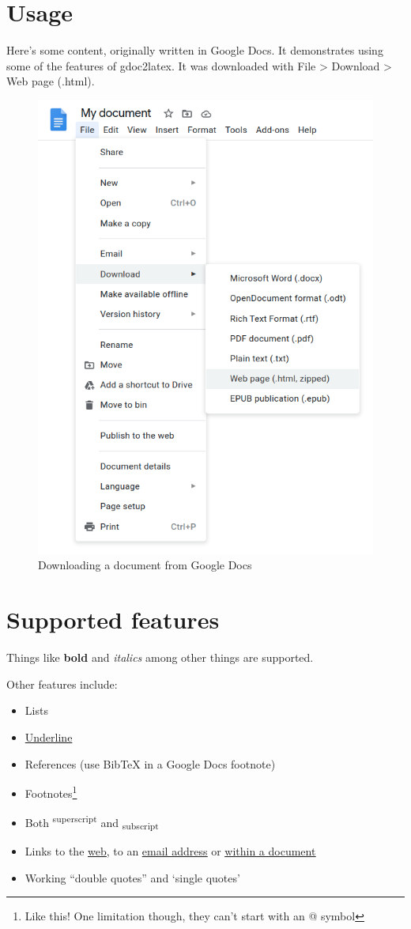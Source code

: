 \documentclass[12pt]{article}
\date{}
\author{}
\begin{document}
\maketitle



\section{Usage}\label{id:h.9brqho78gj4b}
Here’s some content, originally written in Google Docs. It demonstrates using some of the features of gdoc2latex. It was downloaded with File > Download > Web page (.html).

{\centering \begin{figure}[h!]
  \centering
  \includegraphics[width=0.578\linewidth]{images/image1.png}
  \caption{Downloading a document from Google Docs}
\end{figure} \par}
\section{Supported features}\label{id:h.3pfyws1px6lp}
Things like \textbf{bold} and \textit{italics} among other things are supported.

Other features include:
\begin{itemize}
  \item Lists
  \item \underline{Underline}
  \item References (use BibTeX in a Google Docs footnote)\cite{ref1}
  \item Footnotes\footnote{Like this! One limitation though, they can’t start with an @ symbol}
  \item Both \textsuperscript{superscript} and \textsubscript{subscript}
  \item Links to the \underline{\href{https://github.com/domdomegg/gdoc2latex}{web}}, to an \underline{\href{mailto:someone@example.com}{email address}} or \underline{\hyperref[id:h.9brqho78gj4b]{within a document}}
  \item Working “double quotes” and ‘single quotes’
\end{itemize}
\end{document}
